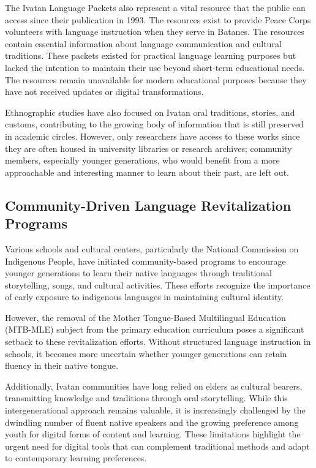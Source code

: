                 The  Ivatan Language Packets also represent a vital resource that the public can access since their publication in  1993. The resources exist to provide Peace Corps volunteers with language instruction when they serve in Batanes.  The resources contain essential information about language communication and cultural traditions. These packets existed for practical language learning purposes  but lacked the intention to maintain their use beyond short-term educational needs. The resources remain unavailable for modern  educational purposes because they have not received updates or digital transformations.

                Ethnographic studies have also focused on Ivatan oral traditions, stories, and customs, contributing to the growing body of information that is still preserved in academic circles. However, only researchers have access to these works since they are often housed in university libraries or research archives; community members, especially younger generations, who would benefit from a more approachable and interesting manner to learn about their past, are left out.

                \subsection {Community-Driven Language Revitalization Programs}
                Various schools and cultural centers, particularly the National Commission on Indigenous People, have initiated community-based programs to encourage younger generations to learn their native languages through traditional storytelling, songs, and cultural activities. These efforts recognize the importance of early exposure to indigenous languages in maintaining cultural identity.

                However, the removal of the Mother Tongue-Based Multilingual Education (MTB-MLE) subject from the primary education curriculum poses a significant setback to these revitalization efforts. Without structured language instruction in schools, it becomes more uncertain whether younger generations can retain fluency in their native tongue.

                Additionally, Ivatan communities have long relied on elders as cultural bearers, transmitting knowledge and traditions through oral storytelling. While this intergenerational approach remains valuable, it is increasingly challenged by the dwindling number of fluent native speakers and the growing preference among youth for digital forms of content and learning. These limitations highlight the urgent need for digital tools that can complement traditional methods and adapt to contemporary learning preferences.

